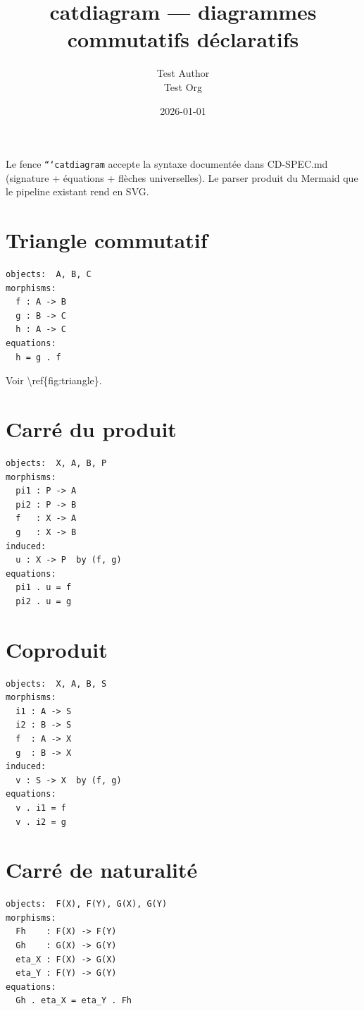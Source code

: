 \documentclass[11pt,a4paper]{article}
\title{catdiagram — diagrammes commutatifs déclaratifs}
\author{Test Author \\ Test Org}
\date{2026-01-01}
\theoremstyle{definition}
\begin{document}
\maketitle

Le fence \texttt{```catdiagram} accepte la syntaxe documentée dans CD-SPEC.md
(signature + équations + flèches universelles). Le parser produit du
Mermaid que le pipeline existant rend en SVG.


\section{Triangle commutatif}

\begin{lstlisting}
objects:  A, B, C
morphisms:
  f : A -> B
  g : B -> C
  h : A -> C
equations:
  h = g . f
\end{lstlisting}


Voir \textbackslash{}ref\{fig:triangle\}.


\section{Carré du produit}

\begin{lstlisting}
objects:  X, A, B, P
morphisms:
  pi1 : P -> A
  pi2 : P -> B
  f   : X -> A
  g   : X -> B
induced:
  u : X -> P  by (f, g)
equations:
  pi1 . u = f
  pi2 . u = g
\end{lstlisting}


\section{Coproduit}

\begin{lstlisting}
objects:  X, A, B, S
morphisms:
  i1 : A -> S
  i2 : B -> S
  f  : A -> X
  g  : B -> X
induced:
  v : S -> X  by (f, g)
equations:
  v . i1 = f
  v . i2 = g
\end{lstlisting}


\section{Carré de naturalité}

\begin{lstlisting}
objects:  F(X), F(Y), G(X), G(Y)
morphisms:
  Fh    : F(X) -> F(Y)
  Gh    : G(X) -> G(Y)
  eta_X : F(X) -> G(X)
  eta_Y : F(Y) -> G(Y)
equations:
  Gh . eta_X = eta_Y . Fh
\end{lstlisting}
\end{document}
